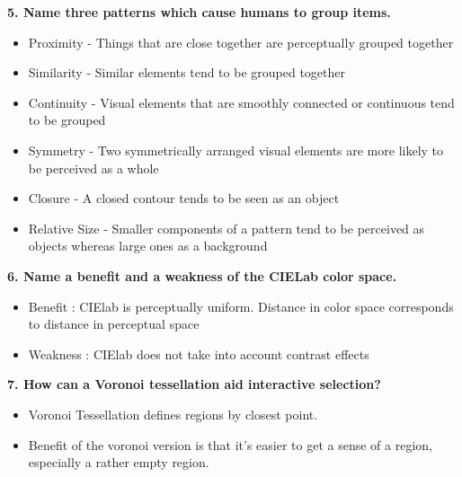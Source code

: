 \documentclass{article}[12pt]
\begin{document}
\vspace{2ex}\noindent
{ \bf 5. Name three patterns which cause humans to group items.  }

{
    \begin{itemize}
    \item	Proximity - Things that are close together are perceptually grouped together
	\item   Similarity - Similar elements tend to be grouped together
	\item   Continuity - Visual elements that are smoothly connected or continuous tend to be grouped
	\item   Symmetry - Two symmetrically arranged visual elements are more likely to be perceived as a whole
	\item   Closure - A closed contour tends to be seen as an object
	\item   Relative Size - Smaller components of a pattern tend to be perceived as objects whereas large ones as a background

 	 \end{itemize}

}

\vspace{2ex}\noindent
{ \bf 6. Name a benefit and a weakness of the CIELab color space. }

{   \begin{itemize}
	\item   Benefit : CIElab is perceptually uniform. Distance in color space corresponds to distance in perceptual space
	\item Weakness : CIElab does not take into account contrast effects 
    \end{itemize}
}

\vspace{2ex}\noindent
{ \bf 7. How can a Voronoi tessellation aid interactive selection? }

{
    \begin{itemize}
	\item Voronoi Tessellation defines regions by closest point.
	\item  Benefit of the voronoi version is that it’s easier to get a sense of a region, especially a rather empty region.
    \end{itemize}
}
\end{document}
